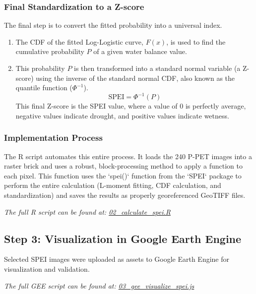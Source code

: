 \documentclass[12pt, a4paper]{article}
\begin{document}
\subsubsection{Final Standardization to a Z-score}
The final step is to convert the fitted probability into a universal index.
\begin{enumerate}
    \item The CDF of the fitted Log-Logistic curve, $F(x)$, is used to find the cumulative probability $P$ of a given water balance value.
    \item This probability $P$ is then transformed into a standard normal variable (a Z-score) using the inverse of the standard normal CDF, also known as the quantile function ($\Phi^{-1}$).
    \[ \text{SPEI} = \Phi^{-1}(P) \]
    This final Z-score is the SPEI value, where a value of 0 is perfectly average, negative values indicate drought, and positive values indicate wetness.
\end{enumerate}

\newpage

\subsubsection{Implementation Process}
The R script automates this entire process. It loads the 240 P-PET images into a raster brick and uses a robust, block-processing method to apply a function to each pixel. This function uses the `spei()` function from the `SPEI` package to perform the entire calculation (L-moment fitting, CDF calculation, and standardization) and saves the results as properly georeferenced GeoTIFF files.
\begin{center}
    \textit{The full R script can be found at: \href{https://github.com/Actuallyanonymous/spei-drought-analysis-pipeline/blob/main/scripts/02_calculate_spei.R}{02\_calculate\_spei.R}}
\end{center}

\subsection{Step 3: Visualization in Google Earth Engine}
Selected SPEI images were uploaded as assets to Google Earth Engine for visualization and validation.
\begin{center}
    \textit{The full GEE script can be found at: \href{https://github.com/Actuallyanonymous/spei-drought-analysis-pipeline/blob/main/scripts/03_gee_visualize_spei.js}{03\_gee\_visualize\_spei.js}}
\end{center}
\end{document}
